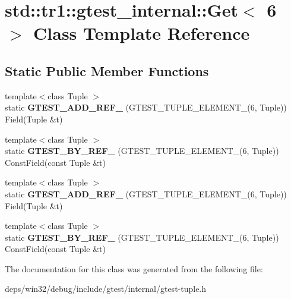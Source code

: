 \hypertarget{classstd_1_1tr1_1_1gtest__internal_1_1_get_3_016_01_4}{}\section{std\+:\+:tr1\+:\+:gtest\+\_\+internal\+:\+:Get$<$ 6 $>$ Class Template Reference}
\label{classstd_1_1tr1_1_1gtest__internal_1_1_get_3_016_01_4}
\subsection*{Static Public Member Functions}
\begin{DoxyCompactItemize}
\item 
\hypertarget{classstd_1_1tr1_1_1gtest__internal_1_1_get_3_016_01_4_a28034152d066c8644fa55e9fc0e3a12d}{}{\footnotesize template$<$class Tuple $>$ }\\static {\bfseries G\+T\+E\+S\+T\+\_\+\+A\+D\+D\+\_\+\+R\+E\+F\+\_\+} (G\+T\+E\+S\+T\+\_\+\+T\+U\+P\+L\+E\+\_\+\+E\+L\+E\+M\+E\+N\+T\+\_\+(6, Tuple)) Field(Tuple \&t)\label{classstd_1_1tr1_1_1gtest__internal_1_1_get_3_016_01_4_a28034152d066c8644fa55e9fc0e3a12d}

\item 
\hypertarget{classstd_1_1tr1_1_1gtest__internal_1_1_get_3_016_01_4_a6e396b998757e0ab9b75db0c68a7c360}{}{\footnotesize template$<$class Tuple $>$ }\\static {\bfseries G\+T\+E\+S\+T\+\_\+\+B\+Y\+\_\+\+R\+E\+F\+\_\+} (G\+T\+E\+S\+T\+\_\+\+T\+U\+P\+L\+E\+\_\+\+E\+L\+E\+M\+E\+N\+T\+\_\+(6, Tuple)) Const\+Field(const Tuple \&t)\label{classstd_1_1tr1_1_1gtest__internal_1_1_get_3_016_01_4_a6e396b998757e0ab9b75db0c68a7c360}

\item 
\hypertarget{classstd_1_1tr1_1_1gtest__internal_1_1_get_3_016_01_4_a28034152d066c8644fa55e9fc0e3a12d}{}{\footnotesize template$<$class Tuple $>$ }\\static {\bfseries G\+T\+E\+S\+T\+\_\+\+A\+D\+D\+\_\+\+R\+E\+F\+\_\+} (G\+T\+E\+S\+T\+\_\+\+T\+U\+P\+L\+E\+\_\+\+E\+L\+E\+M\+E\+N\+T\+\_\+(6, Tuple)) Field(Tuple \&t)\label{classstd_1_1tr1_1_1gtest__internal_1_1_get_3_016_01_4_a28034152d066c8644fa55e9fc0e3a12d}

\item 
\hypertarget{classstd_1_1tr1_1_1gtest__internal_1_1_get_3_016_01_4_a6e396b998757e0ab9b75db0c68a7c360}{}{\footnotesize template$<$class Tuple $>$ }\\static {\bfseries G\+T\+E\+S\+T\+\_\+\+B\+Y\+\_\+\+R\+E\+F\+\_\+} (G\+T\+E\+S\+T\+\_\+\+T\+U\+P\+L\+E\+\_\+\+E\+L\+E\+M\+E\+N\+T\+\_\+(6, Tuple)) Const\+Field(const Tuple \&t)\label{classstd_1_1tr1_1_1gtest__internal_1_1_get_3_016_01_4_a6e396b998757e0ab9b75db0c68a7c360}

\end{DoxyCompactItemize}


The documentation for this class was generated from the following file\+:\begin{DoxyCompactItemize}
\item 
deps/win32/debug/include/gtest/internal/gtest-\/tuple.\+h\end{DoxyCompactItemize}

